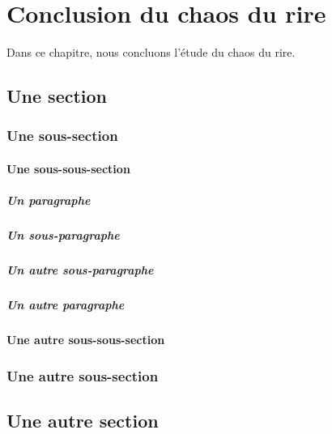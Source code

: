 \chapter{Conclusion du chaos du rire}
Dans ce chapitre, nous concluons l'étude du chaos du rire.

\lipsum[26-27]
\section{Une section}
\lipsum[28-29]
\subsection{Une sous-section}
\lipsum[29-31]
\subsubsection{Une sous-sous-section}
\lipsum[31-35]
\paragraph{Un paragraphe}
\lipsum[36-38]
\paragraph{Un sous-paragraphe}
\lipsum[39-41]
\paragraph{Un autre sous-paragraphe}
\lipsum[39-41]
\paragraph{Un autre paragraphe}
\lipsum[36-38]
\subsubsection{Une autre sous-sous-section}
\lipsum[31-35]
\subsection{Une autre sous-section}
\lipsum[29-31]
\section{Une autre section}
\lipsum[28-29]

